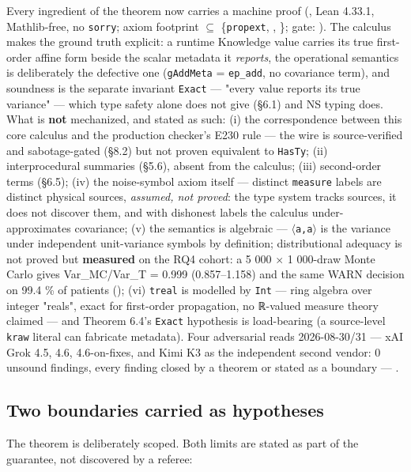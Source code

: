 \documentclass[sigplan,review,anonymous,10pt]{acmart}
\begin{document}
Every ingredient of the theorem now carries a machine proof (, Lean 4.33.1, Mathlib-free, no \texttt{sorry}; axiom footprint $\subseteq$ \{\texttt{propext}, , \}; gate: ). The calculus makes the ground truth explicit: a runtime Knowledge value carries its true first-order affine form beside the scalar metadata it \emph{reports}, the operational semantics is deliberately the defective one (\texttt{gAddMeta} = \texttt{ep\_add}, no covariance term), and soundness is the separate invariant \texttt{Exact} --- "every value reports its true variance" --- which type safety alone does not give (§6.1) and NS typing does. What is \textbf{not} mechanized, and stated as such: (i) the correspondence between this core calculus and the production checker's E230 rule --- the wire is source-verified and sabotage-gated (§8.2) but not proven equivalent to \texttt{HasTy}; (ii) interprocedural summaries (§5.6), absent from the calculus; (iii) second-order terms (§6.5); (iv) the noise-symbol axiom itself --- distinct \texttt{measure} labels are distinct physical sources, \emph{assumed, not proved}: the type system tracks sources, it does not discover them, and with dishonest labels the calculus under-approximates covariance; (v) the semantics is algebraic --- \texttt{$\langle$a,a$\rangle$} is the variance under independent unit-variance symbols by definition; distributional adequacy is not proved but \textbf{measured} on the RQ4 cohort: a 5 000 $\times$ 1 000-draw Monte Carlo gives Var\_MC/Var\_T = 0.999 (0.857--1.158) and the same WARN decision on 99.4 \% of patients (); (vi) \texttt{treal} is modelled by \texttt{Int} --- ring algebra over integer "reals", exact for first-order propagation, no ℝ-valued measure theory claimed --- and Theorem 6.4's \texttt{Exact} hypothesis is load-bearing (a source-level \texttt{kraw} literal can fabricate metadata). Four adversarial reads 2026-08-30/31 --- xAI Grok 4.5, 4.6, 4.6-on-fixes, and Kimi K3 as the independent second vendor: 0 unsound findings, every finding closed by a theorem or stated as a boundary --- .

\subsection{Two boundaries carried as hypotheses}

The theorem is deliberately scoped. Both limits are stated as part of the guarantee, not discovered by a referee:
\end{document}
